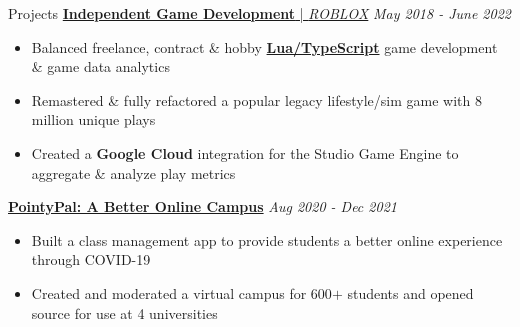 \documentclass{content/resume/resume}
\begin{document}
\begin{rSection}{Projects}
  \href{https://spelkington.github.io/?search=Roblox}{{\bf Independent Game Development} | {\em ROBLOX}} \hfill {\em May 2018 - June 2022}
  \vspace{-6pt}
  \begin{itemize}[nosep]
    \item Balanced freelance, contract \& hobby \href{https://github.com/search?p=1&q=user\%3ASpelkington+extension\%3Ats+extension\%3Atsx+extension\%3Alua&type=Code}{\bf Lua/TypeScript} game development \& game data analytics
    \item Remastered \& fully refactored a popular legacy lifestyle/sim game with 8 million unique plays
    \item Created a {\bf Google Cloud} integration for the Studio Game Engine to aggregate \& analyze play metrics
  \end{itemize}

  \href{https://github.com/UtahTriangle/pointypal#pointypal-zoom-school-done-better}{\bf PointyPal: A Better Online Campus} \hfill {\em Aug 2020 - Dec 2021}
  \vspace{-6pt}
  \begin{itemize}[nosep]
    \item Built a class management app to provide students a better online experience through COVID-19
    \item Created and moderated a virtual campus for 600$+$ students and opened source for use at 4 universities
  \end{itemize}



\end{rSection}
\end{document}
